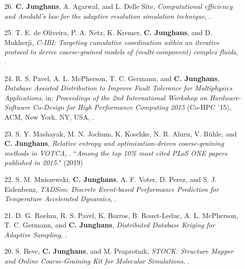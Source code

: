 \documentclass{article}
\begin{document}
\begin{enumerate}
\item[26.] \textbf{C. Junghans}, A. Agarwal, and L. Delle Site,
  \textit{Computational efficiency and Amdahl’s law for the adaptive resolution simulation technique},
  .

\item[25.] T. E. de Oliveira, P. A. Netz, K. Kremer, \textbf{C. Junghans}, and D. Mukherji,
  \textit{C-IBI: Targeting cumulative coordination within an iterative protocol to derive coarse-grained models of (multi-component) complex fluids},
  .

\item[24.] R. S. Pavel, A. L. McPherson, T. C. Germann, and \textbf{C. Junghans},
  \textit{Database Assisted Distribution to Improve Fault Tolerance for Multiphysics Applications},
  in: \textit{Proceedings of the 2nd International Workshop on Hardware-Software Co-Design for High Performance Computing 2015} (Co-HPC '15),
  ACM, New York, NY, USA, .

\item[23.] S. Y. Mashayak, M. N. Jochum, K. Koschke, N. R. Aluru, V. R{\"u}hle, and \textbf{C. Junghans},
  \textit{Relative entropy and optimization-driven coarse-graining methods in VOTCA},
  .
   ``\emph{Among the top 10\% most cited PLoS ONE papers published in 2015.}" (2019)

\item[22.] S. M. Mniszewski, \textbf{C. Junghans}, A. F. Voter, D. Perez, and S. J. Eidenbenz,
  \textit{TADSim: Discrete Event-based Performance Prediction for Temperature Accelerated Dynamics},
  .

\item[21.] D. G. Roehm, R. S. Pavel, K. Barros, B. Rouet-Leduc, A. L. McPherson, T. C. Germann, and \textbf{C. Junghans},
  \textit{Distributed Database Kriging for Adaptive Sampling},
  .

\item[20.] S. Bevc, \textbf{C. Junghans}, and M. Praprotnik,
  \textit{STOCK: Structure Mapper and Online Coarse-Graining Kit for Molecular Simulations},
  .


\end{enumerate}
\end{document}
